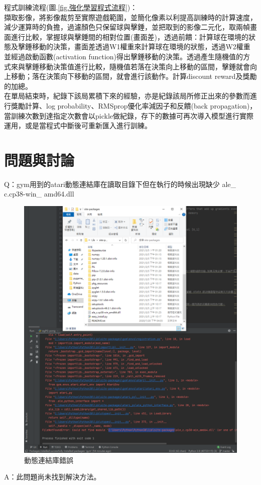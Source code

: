 \documentclass[14pt,a4paper]{report}  %
\begin{document}
程式訓練流程(圖.\ref{fig.強化學習程式流程})：\\
 擷取影像，將影像裁剪至實際遊戲範圍，並簡化像素以利提高訓練時的計算速度，減少運算時的負擔，過濾顏色只保留球與擊錘，並把取到的影像二元化，取兩幀畫面進行比較，掌握球與擊錘間的相對位置(畫面差)，透過前饋：計算球在環境的狀態及擊錘移動的決策，畫面差透過W1權重來計算球在環境的狀態，透過W2權重並經過啟動函數(activation function)得出擊錘移動的決策。透過產生隨機值的方式來與擊錘移動決策值進行比較，隨機值若落在決策向上移動的區間，擊錘就會向上移動；落在決策向下移動的區間，就會進行該動作。計算discount reward及獎勵的加總。\\

 在單局結束時，紀錄下該局累積下來的經驗，亦是紀錄該局所修正出來的參數而進行獎勵計算、log probability、RMSprop優化率減因子和反饋(back propagation)，當訓練次數到達指定次數會以pickle做紀錄，存下的數據可再次導入模型進行實際運用，或是當程式中斷後可重新匯入進行訓練。\\

\newpage
\chapter{問題與討論}
\hspace{-1.7em} Q：gym用到的atari動態連結庫在讀取目錄下但在執行的時候出現缺少 ale\_ c.cp38-win\_ amd64.dll\\
\begin{figure}[hbt!]
\begin{center}
\includegraphics[width=15cm]{Q_dll}
\caption{\Large 動態連結庫錯誤}
\label{fig.動態連結庫錯誤}
\end{center}
\end{figure}
A：此問題尚未找到解決方法。\\
\end{document}
